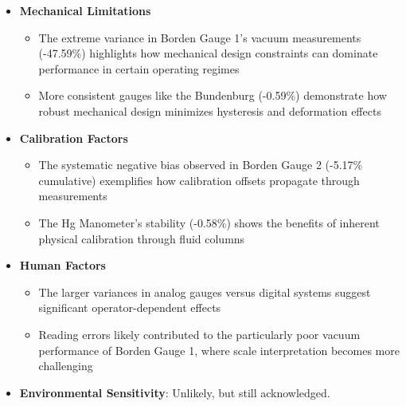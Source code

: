 \documentclass{article}
\begin{document}
\begin{itemize}
	\item \textbf{Mechanical Limitations}
	\begin{itemize}
		\item The extreme variance in Borden Gauge 1's vacuum measurements (-47.59\%) highlights how mechanical design constraints can dominate performance in certain operating regimes
		\item More consistent gauges like the Bundenburg (-0.59\%) demonstrate how robust mechanical design minimizes hysteresis and deformation effects
	\end{itemize}
	
	\item \textbf{Calibration Factors}
	\begin{itemize}
		\item The systematic negative bias observed in Borden Gauge 2 (-5.17\% cumulative) exemplifies how calibration offsets propagate through measurements
		\item The Hg Manometer's stability (-0.58\%) shows the benefits of inherent physical calibration through fluid columns
	\end{itemize}
	
	\item \textbf{Human Factors}
	\begin{itemize}
		\item The larger variances in analog gauges versus digital systems suggest significant operator-dependent effects
		\item Reading errors likely contributed to the particularly poor vacuum performance of Borden Gauge 1, where scale interpretation becomes more challenging
	\end{itemize}
	
	\item \textbf{Environmental Sensitivity}: Unlikely, but still acknowledged.
\end{itemize}

\newpage
\end{document}
